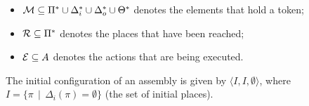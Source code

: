 \begin{itemize}
  \item $\mathcal{M} \subseteq \Pi^{*} \cup
    \Delta_{i}^{*}\cup\Delta_{o}^{*}\cup\Theta^{*}$ denotes the
    elements that hold a token;
  \item $\mathcal{R} \subseteq \Pi^*$ denotes the places that have been
    reached;
  \item $\mathcal{E} \subseteq A$ denotes the actions that are being executed.
\end{itemize}

The initial configuration of an assembly is given by $\langle I, I,
\emptyset\rangle$, where $I = \{ \pi \, \mid \, \Delta_i(\pi) =
\emptyset \}$ (\ie the set of initial places).








